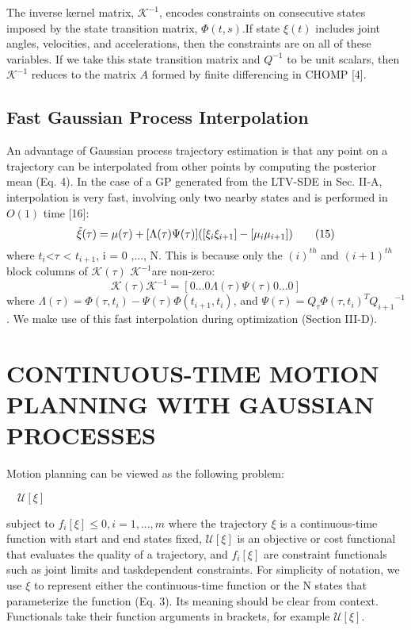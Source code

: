 \documentclass{IEEEtran}
\begin{document}
The inverse kernel matrix, ${\mathcal{K}}^{-1}$, encodes constraints on
consecutive states imposed by the state transition matrix,
$\Phi(t, s)$.If state $\xi(t)$ includes joint angles, velocities, and
accelerations, then the constraints are on all of these variables. If we take this state transition matrix and $Q^{-1}$
to be
unit scalars, then ${\mathcal{K}}^{-1}$
reduces to the matrix $\textit{A}$ formed by
finite differencing in CHOMP [4].

\subsection{Fast Gaussian Process Interpolation}

An advantage of Gaussian process trajectory estimation
is that any point on a trajectory can be interpolated from
other points by computing the posterior mean (Eq. 4). In
the case of a GP generated from the LTV-SDE in Sec. II-A,
interpolation is very fast, involving only two nearby states
and is performed in $\textit{O}(1)$ time [16]:
\begin{equation}
\tilde{\xi}(\tau)=\mu(\tau)+[\Lambda(\tau)\Psi(\tau)]([{\xi_i}\\{\xi_{i+1}}]-[{\mu_i}\\{\mu_{i+1}}])\tag{15}
\end{equation}
where ${t_i}$<${\tau}$ < ${t_{i+1}}$, i = 0 ,..., N. This is because only the
${(i)^{th}}$ and ${(i+1)^{th}}$ block columns of ${\mathcal{K}(\tau)}$ ${\mathcal{K}^{-1}}$are non-zero:
\begin{equation}
{\mathcal{K}(\tau)}{\mathcal{K}^{-1}}=[0...0{\Lambda(\tau)}{\Psi(\tau)}0...0]\tag{16}
\end{equation}
where ${\Lambda(\tau)}=\Phi(\tau,t_i)-\Psi(\tau)\Phi(t_{i+1},t_i)$, and $\Psi(\tau)=Q_{\tau}{\Phi(\tau,t_i)}^T{Q_{i+1}}^{-1}$ . We make use of this fast interpolation
during optimization (Section III-D).
\section{CONTINUOUS-TIME MOTION PLANNING WITH GAUSSIAN PROCESSES}
Motion planning can be viewed as the following problem:

\hspace*{40pt}$\quad \mathcal{U}[\xi]$

\hspace*{40pt}subject to \quad ${f_i[\xi]}\leq0, i=1,...,m$
where the trajectory $\xi$ is a continuous-time function with
start and end states fixed, $\mathcal{U}[\xi]$ is an objective or cost
functional that evaluates the quality of a trajectory, and
$f_i[{\xi}]$ are constraint functionals such as joint limits and taskdependent constraints. For simplicity of notation, we use $\xi$ to
represent either the continuous-time function or the N states
that parameterize the function (Eq. 3). Its meaning should be
clear from context. Functionals take their function arguments
in brackets, for example $\mathcal{U}[\xi]$.
\end{document}
